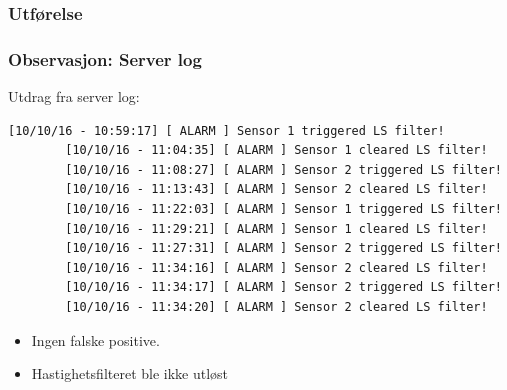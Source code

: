 \documentclass[xcolor=table]{beamer}
\begin{document}
\begin{frame}
\frametitle{Utførelse}
\begin{center}
\end{center}
\end{frame}

\begin{frame}[fragile]
\frametitle{Observasjon: Server log}
Utdrag fra server log:
      \begin{lstlisting}[basicstyle=\ttfamily\tiny]
        [10/10/16 - 10:59:17] [ ALARM ] Sensor 1 triggered LS filter!
        [10/10/16 - 11:04:35] [ ALARM ] Sensor 1 cleared LS filter!
        [10/10/16 - 11:08:27] [ ALARM ] Sensor 2 triggered LS filter!
        [10/10/16 - 11:13:43] [ ALARM ] Sensor 2 cleared LS filter!
        [10/10/16 - 11:22:03] [ ALARM ] Sensor 1 triggered LS filter!
        [10/10/16 - 11:29:21] [ ALARM ] Sensor 1 cleared LS filter!
        [10/10/16 - 11:27:31] [ ALARM ] Sensor 2 triggered LS filter!
        [10/10/16 - 11:34:16] [ ALARM ] Sensor 2 cleared LS filter!
        [10/10/16 - 11:34:17] [ ALARM ] Sensor 2 triggered LS filter!
        [10/10/16 - 11:34:20] [ ALARM ] Sensor 2 cleared LS filter!
      \end{lstlisting} 
\begin{itemize}
  \item Ingen falske positive.
  \item Hastighetsfilteret ble ikke utløst
\end{itemize}
\end{frame}
\end{document}
